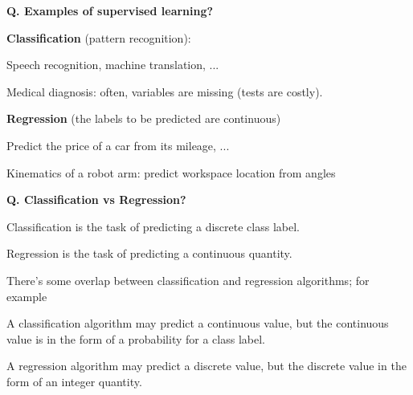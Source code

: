 \begin{frame}[fragile]{\textbf{Q. Examples of supervised learning?}}
  \begin{wideitemize}
  \item \textbf{Classification} (pattern recognition):
    \begin{wideitemize}
    \item Speech recognition, machine translation, ...
    \item Medical diagnosis: often, variables are missing (tests are costly).
    \end{wideitemize}
  \item \textbf{Regression} (the labels to be predicted are continuous)
    \begin{wideitemize}
    \item Predict the price of a car from its mileage, ...
    \item Kinematics of a robot arm: predict workspace location from angles
    \end{wideitemize}
  \end{wideitemize}
\end{frame}

\begin{frame}[fragile]{\textbf{Q. Classification vs Regression?}}
  \begin{wideitemize}
  \item Classification is the task of predicting a discrete class label.
  \item Regression is the task of predicting a continuous quantity.
  \item There's some overlap between classification and regression algorithms; for example
    \begin{wideitemize}
    \item A classification algorithm may predict a continuous value, but the
      continuous value is in the form of a probability for a class label.
    \item A regression algorithm may predict a discrete value, but the discrete
      value in the form of an integer quantity.
    \end{wideitemize}
  \end{wideitemize}
\end{frame}



